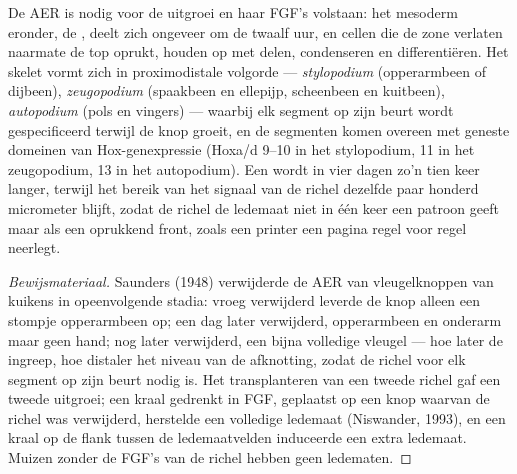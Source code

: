 \begin{proposition}\label{prop:b2:limb-organogenesis:aer}
De AER is nodig voor de uitgroei en haar FGF's volstaan: het mesoderm eronder,
de \emph{}, deelt zich ongeveer om de twaalf uur, en cellen
die de zone verlaten naarmate de top oprukt, houden op met delen,
condenseren en differentiëren. Het skelet vormt zich in proximodistale
volgorde --- \emph{stylopodium} (opperarmbeen of dijbeen),
\emph{zeugopodium} (spaakbeen en ellepijp, scheenbeen en kuitbeen),
\emph{autopodium} (pols en vingers) --- waarbij elk segment op zijn beurt
wordt gespecificeerd terwijl de knop groeit, en de segmenten komen overeen
met geneste domeinen van Hox-genexpressie (Hoxa/d 9--10 in het stylopodium,
11 in het zeugopodium, 13 in het autopodium). Een  wordt in
vier dagen zo'n tien keer langer, terwijl het bereik van het signaal van de
richel dezelfde paar honderd micrometer blijft, zodat de richel de ledemaat
niet in één keer een patroon geeft maar als een oprukkend front, zoals een
printer een pagina regel voor regel neerlegt.
\end{proposition}
\begin{proof}[Bewijsmateriaal]
Saunders (1948) verwijderde de AER van vleugelknoppen van kuikens in
opeenvolgende stadia: vroeg verwijderd leverde de knop alleen een stompje
opperarmbeen op; een dag later verwijderd, opperarmbeen en onderarm maar
geen hand; nog later verwijderd, een bijna volledige vleugel --- hoe later
de ingreep, hoe distaler het niveau van de afknotting, zodat de richel
voor elk segment op zijn beurt nodig is. Het transplanteren van een tweede
richel gaf een tweede uitgroei; een kraal gedrenkt in FGF, geplaatst op een
knop waarvan de richel was verwijderd, herstelde een volledige ledemaat
(Niswander, 1993), en een kraal op de flank tussen de ledemaatvelden
induceerde een extra ledemaat. Muizen zonder de FGF's van de richel hebben
geen ledematen.
\end{proof}

